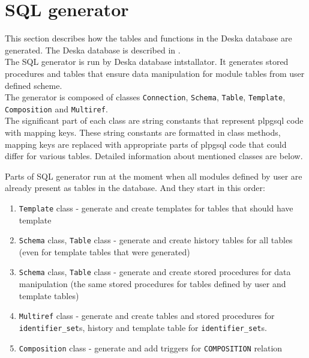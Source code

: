 \documentclass[deska]{subfiles}
\begin{document}
\label{sec:sql-procedures}

\section{SQL generator}
\label{sec:sql-generator}
This section describes how the tables and functions in the Deska database are generated. The Deska database is described in .\\
The SQL generator is run by Deska database intstallator. It generates stored procedures and tables that ensure data
manipulation for module tables from user defined scheme.\\

The generator is composed of classes {\tt Connection}, {\tt Schema}, {\tt Table}, {\tt Template}, {\tt Composition} and {\tt Multiref}.\\
The significant part of each class are string constants that represent plpgsql code with mapping keys. These string constants are formatted in class methods, mapping keys are replaced with appropriate parts of plpgsql code that could differ for various tables.
Detailed information about mentioned classes are below.

Parts of SQL generator run at the moment when all modules defined by user are already present as tables in the database. And they start in this order:

\begin{enumerate}
    \item {\tt Template} class - generate and create templates for tables that should have template
    \item {\tt Schema} class, {\tt Table} class - generate and create history tables for all tables (even for template tables that were generated)
    \item {\tt Schema} class, {\tt Table} class - generate and create stored procedures for data manipulation (the same stored procedures for tables defined by user and template tables)
    \item {\tt Multiref} class - generate and create tables and stored procedures for {\tt identifier\_set}s, history and template table for {\tt identifier\_set}s.
    \item {\tt Composition} class - generate and add triggers for {\tt COMPOSITION} relation
\end{enumerate}
\end{document}
